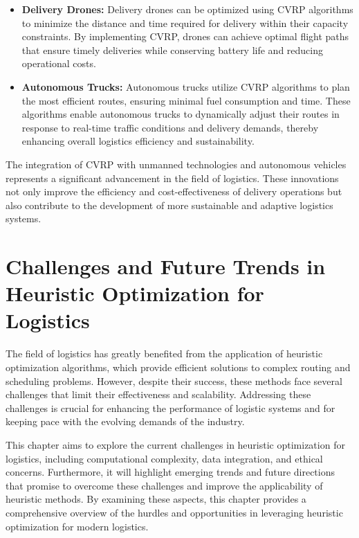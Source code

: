 \documentclass[
]{article}
\begin{document}
    \begin{itemize}
        \item \textbf{Delivery Drones:} Delivery drones can be optimized using CVRP algorithms to minimize the distance and time required for delivery within their capacity constraints. By implementing CVRP, drones can achieve optimal flight paths that ensure timely deliveries while conserving battery life and reducing operational costs.
        \item \textbf{Autonomous Trucks:} Autonomous trucks utilize CVRP algorithms to plan the most efficient routes, ensuring minimal fuel consumption and time. These algorithms enable autonomous trucks to dynamically adjust their routes in response to real-time traffic conditions and delivery demands, thereby enhancing overall logistics efficiency and sustainability.
    \end{itemize}

    The integration of CVRP with unmanned technologies and autonomous vehicles represents a significant advancement in the field of logistics. These innovations not only improve the efficiency and cost-effectiveness of delivery operations but also contribute to the development of more sustainable and adaptive logistics systems.

    \newpage


    \section{Challenges and Future Trends in Heuristic Optimization for Logistics}\label{sec:challenges-and-future-trends-in-heuristic-optimization-for-logistics}

    The field of logistics has greatly benefited from the application of heuristic optimization algorithms, which provide efficient solutions to complex routing and scheduling problems. However, despite their success, these methods face several challenges that limit their effectiveness and scalability. Addressing these challenges is crucial for enhancing the performance of logistic systems and for keeping pace with the evolving demands of the industry.

    This chapter aims to explore the current challenges in heuristic optimization for logistics, including computational complexity, data integration, and ethical concerns. Furthermore, it will highlight emerging trends and future directions that promise to overcome these challenges and improve the applicability of heuristic methods. By examining these aspects, this chapter provides a comprehensive overview of the hurdles and opportunities in leveraging heuristic optimization for modern logistics.
\end{document}
